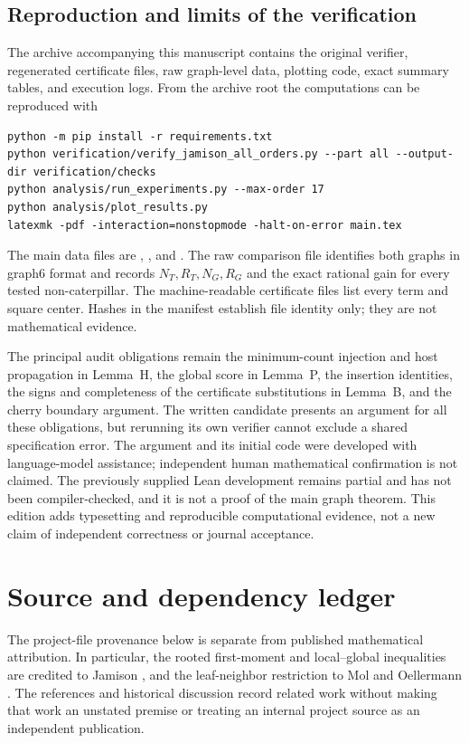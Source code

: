 \documentclass[11pt,reqno]{amsart}
\theoremstyle{plain}
\begin{document}
\subsection{Reproduction and limits of the verification}
The archive accompanying this manuscript contains the original verifier,
regenerated certificate files, raw graph-level data, plotting code, exact
summary tables, and execution logs. From the archive root the computations
can be reproduced with
\begin{Verbatim}[fontsize=\small,breaklines=true,breakanywhere=true]
python -m pip install -r requirements.txt
python verification/verify_jamison_all_orders.py --part all --output-dir verification/checks
python analysis/run_experiments.py --max-order 17
python analysis/plot_results.py
latexmk -pdf -interaction=nonstopmode -halt-on-error main.tex
\end{Verbatim}
The main data files are ,
, and .
The raw comparison file identifies both graphs in graph6 format and records
$N_T,R_T,N_G,R_G$ and the exact rational gain for every tested non-caterpillar.
The machine-readable certificate files list every term and square center.
Hashes in the manifest establish file identity only; they are not mathematical
evidence.

The principal audit obligations remain the minimum-count injection and host
propagation in Lemma~H, the global score in Lemma~P, the insertion identities,
the signs and completeness of the certificate substitutions in Lemma~B, and
the cherry boundary argument. The written candidate presents an argument for
all these obligations, but rerunning its own verifier cannot exclude a shared
specification error. The argument and its initial code were developed with
language-model assistance; independent human mathematical confirmation is not
claimed. The previously supplied Lean development remains partial and has not
been compiler-checked, and it is not a proof of the main graph theorem. This
edition adds typesetting and reproducible computational evidence, not a new
claim of independent correctness or journal acceptance.

\FloatBarrier
\appendix
\section{Source and dependency ledger}\label{appendix-a.-source-and-dependency-ledger}
The project-file provenance below is separate from published mathematical attribution. In particular, the rooted first-moment and local--global inequalities are credited to Jamison \cite{Jamison1983}, and the leaf-neighbor restriction to Mol and Oellermann \cite{MolOellermann2019}. The references and historical discussion record related work without making that work an unstated premise or treating an internal project source as an independent publication.
\end{document}
